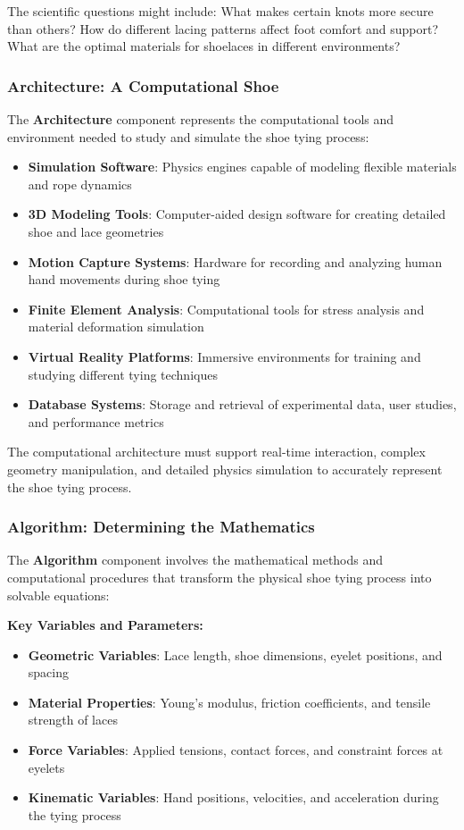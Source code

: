 The scientific questions might include: What makes certain knots more secure than others? How do different lacing patterns affect foot comfort and support? What are the optimal materials for shoelaces in different environments?

\subsubsection{Architecture: A Computational Shoe}

The \textbf{Architecture} component represents the computational tools and environment needed to study and simulate the shoe tying process:

\begin{itemize}
    \item \textbf{Simulation Software}: Physics engines capable of modeling flexible materials and rope dynamics
    \item \textbf{3D Modeling Tools}: Computer-aided design software for creating detailed shoe and lace geometries
    \item \textbf{Motion Capture Systems}: Hardware for recording and analyzing human hand movements during shoe tying
    \item \textbf{Finite Element Analysis}: Computational tools for stress analysis and material deformation simulation
    \item \textbf{Virtual Reality Platforms}: Immersive environments for training and studying different tying techniques
    \item \textbf{Database Systems}: Storage and retrieval of experimental data, user studies, and performance metrics
\end{itemize}

The computational architecture must support real-time interaction, complex geometry manipulation, and detailed physics simulation to accurately represent the shoe tying process.

\subsubsection{Algorithm: Determining the Mathematics}

The \textbf{Algorithm} component involves the mathematical methods and computational procedures that transform the physical shoe tying process into solvable equations:

\textbf{Key Variables and Parameters:}
\begin{itemize}
    \item \textbf{Geometric Variables}: Lace length, shoe dimensions, eyelet positions, and spacing
    \item \textbf{Material Properties}: Young's modulus, friction coefficients, and tensile strength of laces
    \item \textbf{Force Variables}: Applied tensions, contact forces, and constraint forces at eyelets
    \item \textbf{Kinematic Variables}: Hand positions, velocities, and acceleration during the tying process
\end{itemize}

